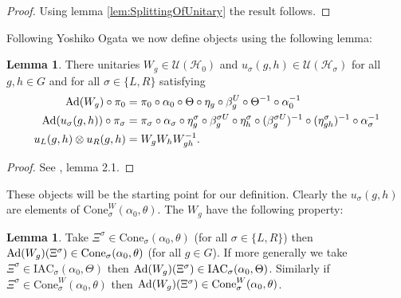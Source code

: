 \documentclass[12pt,a4paper,twoside]{article}
\newcommand{\IAC}{\textrm{IAC}}
\let\originalleft\left
\let\originalright\right
\renewcommand{\left}{\mathopen{}\mathclose\bgroup\originalleft}
\renewcommand{\right}{\aftergroup\egroup\originalright}
\newcommand{\UU}{\mathcal U}
\newcommand{\HH}{\mathcal H}
\newcommand{\Ad}[1]{\textrm{Ad}\left(#1\right)}
\theoremstyle{definition}
\newtheorem{lemma}[theorem]{Lemma}
\numberwithin{equation}{section}
\begin{document}
\begin{proof}
Using lemma \ref{lem:SplittingOfUnitary} the result follows.
\end{proof}
Following Yoshiko Ogata \cite{ogata2021h3gmathbb} we now define objects using the following lemma:
\begin{lemma}\label{lem:Definition_W_And_u}
	There unitaries $W_g\in\UU(\HH_0)$ and $u_{\sigma}(g,h)\in\UU(\HH_{\sigma})$ for all $g,h\in G$ and for all $\sigma\in\{L,R\}$ satisfying
	\begin{align}
		\Ad{W_g}\circ\pi_0&=\pi_0\circ\alpha_0\circ\Theta\circ\eta_g\circ\beta_g^U\circ\Theta^{-1}\circ\alpha_0^{-1}\\
		\Ad{u_\sigma(g,h)}\circ\pi_\sigma&=\pi_\sigma\circ\alpha_\sigma\circ\eta_g^\sigma\circ\beta_g^{\sigma U}\circ\eta_h^{\sigma}\circ(\beta_g^{\sigma U})^{-1}\circ(\eta^\sigma_{gh})^{-1}\circ\alpha_\sigma^{-1}\\
		u_L(g,h)\otimes u_R(g,h)&=W_gW_hW_{gh}^{-1}.
	\end{align}
\end{lemma}
\begin{proof}
	See \cite{ogata2021h3gmathbb}, lemma 2.1.
\end{proof}
These objects will be the starting point for our definition. Clearly the $u_\sigma(g,h)$ are elements of $\textrm{Cone}_\sigma^W(\alpha_0,\theta)$. The $W_g$ have the following property:
\begin{lemma}\label{lem:AdjointOverConeIsInCone}
	Take $\Xi^{\sigma}\in\textrm{Cone}_\sigma(\alpha_0,\theta)$ (for all $\sigma\in\{L,R\}$) then $\Ad{W_g}(\Xi^\sigma)\in\textrm{Cone}_\sigma(\alpha_0,\theta)$ (for all $g\in G$).	If more generally we take $\Xi^\sigma\in\IAC_\sigma(\alpha_0,\Theta)$ then $\Ad{W_g}(\Xi^\sigma)\in\IAC_\sigma(\alpha_0,\Theta)$. Similarly if $\Xi^{\sigma}\in\textrm{Cone}_\sigma^W(\alpha_0,\theta)$ then $\Ad{W_g}(\Xi^\sigma)\in\textrm{Cone}_\sigma^W(\alpha_0,\theta)$.
\end{lemma}
\end{document}
